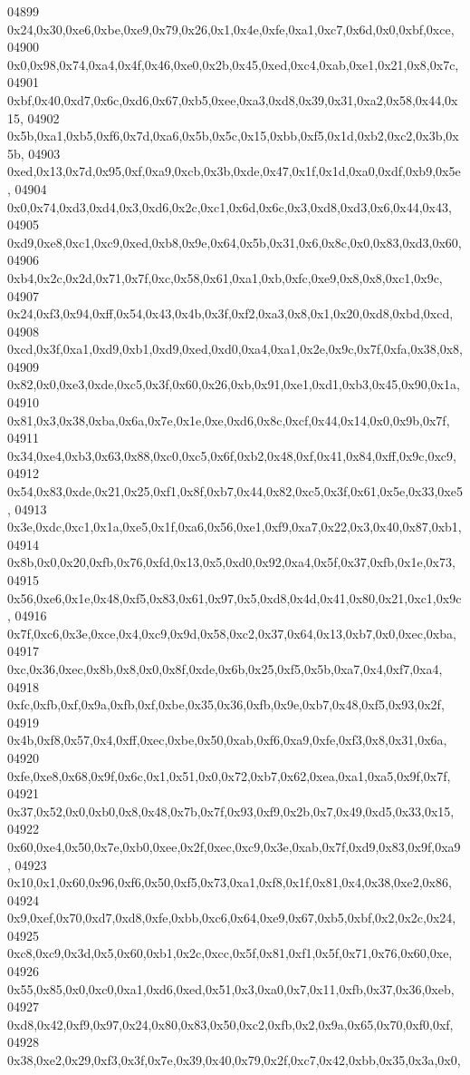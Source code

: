 \begin{DoxyCode}
04899   0x24,0x30,0xe6,0xbe,0xe9,0x79,0x26,0x1,0x4e,0xfe,0xa1,0xc7,0x6d,0x0,0xbf,0xce,
04900   0x0,0x98,0x74,0xa4,0x4f,0x46,0xe0,0x2b,0x45,0xed,0xc4,0xab,0xe1,0x21,0x8,0x7c,
04901   0xbf,0x40,0xd7,0x6c,0xd6,0x67,0xb5,0xee,0xa3,0xd8,0x39,0x31,0xa2,0x58,0x44,0x15,
04902   0x5b,0xa1,0xb5,0xf6,0x7d,0xa6,0x5b,0x5c,0x15,0xbb,0xf5,0x1d,0xb2,0xc2,0x3b,0x5b,
04903   0xed,0x13,0x7d,0x95,0xf,0xa9,0xcb,0x3b,0xde,0x47,0x1f,0x1d,0xa0,0xdf,0xb9,0x5e,
04904   0x0,0x74,0xd3,0xd4,0x3,0xd6,0x2c,0xc1,0x6d,0x6c,0x3,0xd8,0xd3,0x6,0x44,0x43,
04905   0xd9,0xe8,0xc1,0xc9,0xed,0xb8,0x9e,0x64,0x5b,0x31,0x6,0x8c,0x0,0x83,0xd3,0x60,
04906   0xb4,0x2c,0x2d,0x71,0x7f,0xc,0x58,0x61,0xa1,0xb,0xfc,0xe9,0x8,0x8,0xc1,0x9c,
04907   0x24,0xf3,0x94,0xff,0x54,0x43,0x4b,0x3f,0xf2,0xa3,0x8,0x1,0x20,0xd8,0xbd,0xcd,
04908   0xcd,0x3f,0xa1,0xd9,0xb1,0xd9,0xed,0xd0,0xa4,0xa1,0x2e,0x9c,0x7f,0xfa,0x38,0x8,
04909   0x82,0x0,0xe3,0xde,0xc5,0x3f,0x60,0x26,0xb,0x91,0xe1,0xd1,0xb3,0x45,0x90,0x1a,
04910   0x81,0x3,0x38,0xba,0x6a,0x7e,0x1e,0xe,0xd6,0x8c,0xcf,0x44,0x14,0x0,0x9b,0x7f,
04911   0x34,0xe4,0xb3,0x63,0x88,0xc0,0xc5,0x6f,0xb2,0x48,0xf,0x41,0x84,0xff,0x9c,0xc9,
04912   0x54,0x83,0xde,0x21,0x25,0xf1,0x8f,0xb7,0x44,0x82,0xc5,0x3f,0x61,0x5e,0x33,0xe5,
04913   0x3e,0xdc,0xc1,0x1a,0xe5,0x1f,0xa6,0x56,0xe1,0xf9,0xa7,0x22,0x3,0x40,0x87,0xb1,
04914   0x8b,0x0,0x20,0xfb,0x76,0xfd,0x13,0x5,0xd0,0x92,0xa4,0x5f,0x37,0xfb,0x1e,0x73,
04915   0x56,0xe6,0x1e,0x48,0xf5,0x83,0x61,0x97,0x5,0xd8,0x4d,0x41,0x80,0x21,0xc1,0x9c,
04916   0x7f,0xc6,0x3e,0xce,0x4,0xc9,0x9d,0x58,0xc2,0x37,0x64,0x13,0xb7,0x0,0xec,0xba,
04917   0xc,0x36,0xec,0x8b,0x8,0x0,0x8f,0xde,0x6b,0x25,0xf5,0x5b,0xa7,0x4,0xf7,0xa4,
04918   0xfc,0xfb,0xf,0x9a,0xfb,0xf,0xbe,0x35,0x36,0xfb,0x9e,0xb7,0x48,0xf5,0x93,0x2f,
04919   0x4b,0xf8,0x57,0x4,0xff,0xec,0xbe,0x50,0xab,0xf6,0xa9,0xfe,0xf3,0x8,0x31,0x6a,
04920   0xfe,0xe8,0x68,0x9f,0x6c,0x1,0x51,0x0,0x72,0xb7,0x62,0xea,0xa1,0xa5,0x9f,0x7f,
04921   0x37,0x52,0x0,0xb0,0x8,0x48,0x7b,0x7f,0x93,0xf9,0x2b,0x7,0x49,0xd5,0x33,0x15,
04922   0x60,0xe4,0x50,0x7e,0xb0,0xee,0x2f,0xec,0xc9,0x3e,0xab,0x7f,0xd9,0x83,0x9f,0xa9,
04923   0x10,0x1,0x60,0x96,0xf6,0x50,0xf5,0x73,0xa1,0xf8,0x1f,0x81,0x4,0x38,0xe2,0x86,
04924   0x9,0xef,0x70,0xd7,0xd8,0xfe,0xbb,0xc6,0x64,0xe9,0x67,0xb5,0xbf,0x2,0x2c,0x24,
04925   0xc8,0xc9,0x3d,0x5,0x60,0xb1,0x2c,0xcc,0x5f,0x81,0xf1,0x5f,0x71,0x76,0x60,0xe,
04926   0x55,0x85,0x0,0xc0,0xa1,0xd6,0xed,0x51,0x3,0xa0,0x7,0x11,0xfb,0x37,0x36,0xeb,
04927   0xd8,0x42,0xf9,0x97,0x24,0x80,0x83,0x50,0xc2,0xfb,0x2,0x9a,0x65,0x70,0xf0,0xf,
04928   0x38,0xe2,0x29,0xf3,0x3f,0x7e,0x39,0x40,0x79,0x2f,0xc7,0x42,0xbb,0x35,0x3a,0x0,

\end{DoxyCode}
